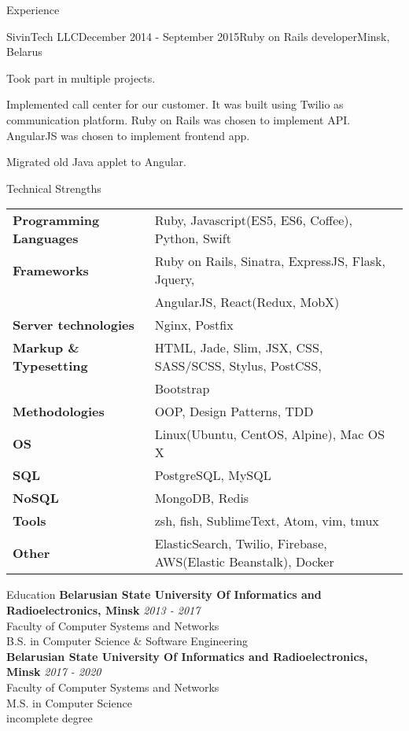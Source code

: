 \documentclass{resume}
\begin{document}
\begin{rSection}{Experience}
    \begin{rSubsection}{SivinTech LLC}{December 2014 - September 2015}{Ruby on Rails developer}{Minsk, Belarus}
    \item Took part in multiple projects. 
    \item Implemented call center for our customer. It was built using Twilio as communication platform. Ruby on Rails was chosen to implement API. AngularJS was chosen to implement frontend app.
    \item Migrated old Java applet to Angular.  
    \end{rSubsection}
  \end{rSection}

  \newpage  
  \begin{rSection}{Technical Strengths}
    \begin{tabular}{ @{} >{\bfseries}l @{\hspace{6ex}} l }
      Programming Languages & Ruby, Javascript(ES5, ES6, Coffee), Python, Swift \\
      Frameworks            & Ruby on Rails, Sinatra, ExpressJS, Flask, Jquery, \\ 
                            & AngularJS, React(Redux, MobX) \\
      Server technologies   & Nginx, Postfix \\
      Markup \& Typesetting & HTML, Jade, Slim, JSX, CSS, SASS/SCSS, Stylus, PostCSS, \\
                            & Bootstrap \\
      Methodologies         & OOP, Design Patterns, TDD \\
      OS                    & Linux(Ubuntu, CentOS, Alpine), Mac OS X \\
      SQL                   & PostgreSQL, MySQL \\
      NoSQL                 & MongoDB, Redis \\
      Tools                 & zsh, fish, SublimeText, Atom, vim, tmux \\
      Other                 & ElasticSearch, Twilio, Firebase, AWS(Elastic Beanstalk), Docker \\
    \end{tabular}
  \end{rSection}

  \begin{rSection}{Education}
    {\bf Belarusian State University Of Informatics and Radioelectronics, Minsk} \hfill {\em 2013 - 2017} \\ 
    { Faculty of Computer Systems and Networks } \\
    { B.S. in Computer Science \& Software Engineering } \\
    {\bf Belarusian State University Of Informatics and Radioelectronics, Minsk} \hfill {\em 2017 - 2020} \\ 
    { Faculty of Computer Systems and Networks } \\
    { M.S. in Computer Science } \\
    { incomplete degree } \\
  \end{rSection}
\end{document}
